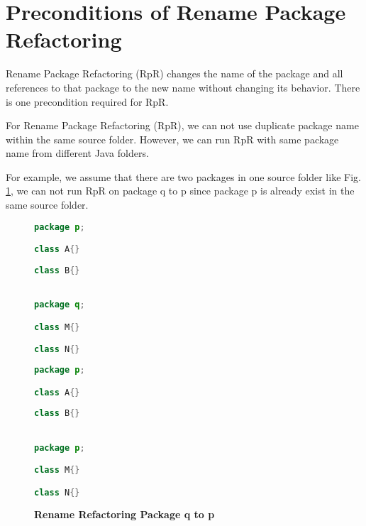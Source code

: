 \section{\textbf{Preconditions of Rename Package Refactoring}}
Rename Package Refactoring (RpR) changes the name of the package and all references to that package to the new name without changing its behavior. There is one precondition required for RpR.

For Rename Package Refactoring (RpR), we can not use duplicate package name within the same source folder. However, we can run RpR with same package name from different Java folders.

For example, we assume that there are two packages in one source folder like Fig. \ref{fig:RpR}, we can not run RpR on package q to p since package p is already exist in the same source folder. 

\begin{figure}[th]
\centering
\begin{minipage}[t]{0.45\linewidth}
\begin{lstlisting}[language=java, basicstyle=\scriptsize\ttfamily,frame=single]
package p;

class A{}
	
class B{}


package q;

class M{}	

class N{}
\end{lstlisting}
\end{minipage}
\hfill
\begin{minipage}[t]{0.45\linewidth}
\begin{lstlisting}[language=java, basicstyle=\scriptsize\ttfamily,frame=single]
package p;

class A{}
	
class B{}


package p;

class M{}	

class N{}


\end{lstlisting}
\end{minipage}
\caption{\textbf{Rename Refactoring Package q to p}}
\label{fig:RpR}
\end{figure}